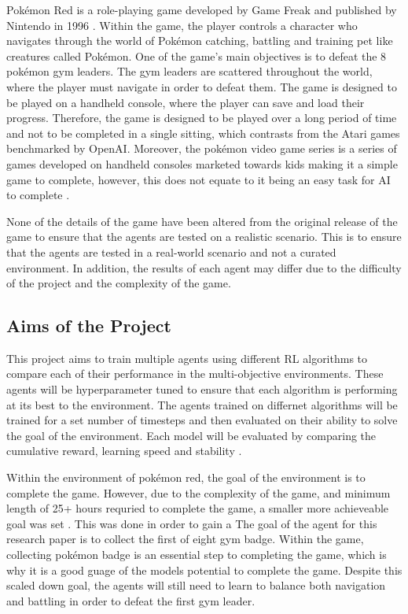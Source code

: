 Pokémon Red is a role-playing game developed by Game Freak and published by Nintendo in 1996 \cite{HubZ_1998}. Within the game, the player controls a character who navigates through the world of Pokémon catching, battling and training pet like creatures called Pokémon. One of the game's main objectives is to defeat the 8 pokémon gym leaders. The gym leaders are scattered throughout the world, where the player must navigate in order to defeat them. The game is designed to be played on a handheld console, where the player can save and load their progress. Therefore, the game is designed to be played over a long period of time and not to be completed in a single sitting, which contrasts from the Atari games benchmarked by OpenAI. Moreover, the pokémon video game series is a series of games developed on handheld consoles marketed towards kids making it a simple game to complete, however, this does not equate to it being an easy task for AI to complete \cite{HubZ_1998}. 

None of the details of the game have been altered from the original release of the game to ensure that the agents are tested on a realistic scenario. This is to ensure that the agents are tested in a real-world scenario and not a curated environment. In addition, the results of each agent may differ due to the difficulty of the project and the complexity of the game.  

\subsection{Aims of the Project}

This project aims to train multiple agents using different RL algorithms to compare each of their performance in the multi-objective environments. These agents will be hyperparameter tuned to ensure that each algorithm is performing at its best to the environment. The agents trained on differnet algorithms will be trained for a set number of timesteps and then evaluated on their ability to solve the goal of the environment. Each model will be evaluated by comparing the cumulative reward, learning speed and stability \cite{Sutton1}. 

Within the environment of pokémon red, the goal of the environment is to complete the game. However, due to the complexity of the game, and minimum length of 25+ hours requried to complete the game, a smaller more achieveable goal was set \cite{howlongtobeat}. This was done in order to gain a  The goal of the agent for this research paper is to collect the first of eight gym badge. Within the game, collecting pokémon badge is an essential step to completing the game, which is why it is a good guage of the models potential to complete the game. Despite this scaled down goal, the agents will still need to learn to balance both navigation and battling in order to defeat the first gym leader.